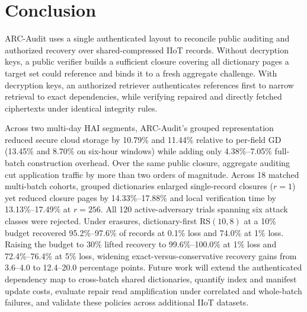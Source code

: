 \documentclass[10pt,journal]{IEEEtran}
\begin{document}
\section{Conclusion}
ARC-Audit uses a single authenticated layout to reconcile public auditing and authorized recovery over shared-compressed IIoT records. Without decryption keys, a public verifier builds a sufficient closure covering all dictionary pages a target set could reference and binds it to a fresh aggregate challenge. With decryption keys, an authorized retriever authenticates references first to narrow retrieval to exact dependencies, while verifying repaired and directly fetched ciphertexts under identical integrity rules.

Across two multi-day HAI segments, ARC-Audit's grouped representation reduced secure cloud storage by 10.79\% and 11.44\% relative to per-field GD (13.45\% and 8.70\% on six-hour windows) while adding only 4.38\%--7.05\% full-batch construction overhead. Over the same public closure, aggregate auditing cut application traffic by more than two orders of magnitude. Across 18 matched multi-batch cohorts, grouped dictionaries enlarged single-record closures ($r=1$) yet reduced closure pages by 14.33\%--17.88\% and local verification time by 13.13\%--17.49\% at $r=256$. All 120 active-adversary trials spanning six attack classes were rejected. Under erasures, dictionary-first RS$(10,8)$ at a 10\% budget recovered 95.2\%--97.6\% of records at 0.1\% loss and 74.0\% at 1\% loss. Raising the budget to 30\% lifted recovery to 99.6\%--100.0\% at 1\% loss and 72.4\%--76.4\% at 5\% loss, widening exact-versus-conservative recovery gains from 3.6--4.0 to 12.4--20.0 percentage points. Future work will extend the authenticated dependency map to cross-batch shared dictionaries, quantify index and manifest update costs, evaluate repair read amplification under correlated and whole-batch failures, and validate these policies across additional IIoT datasets.



\end{document}
